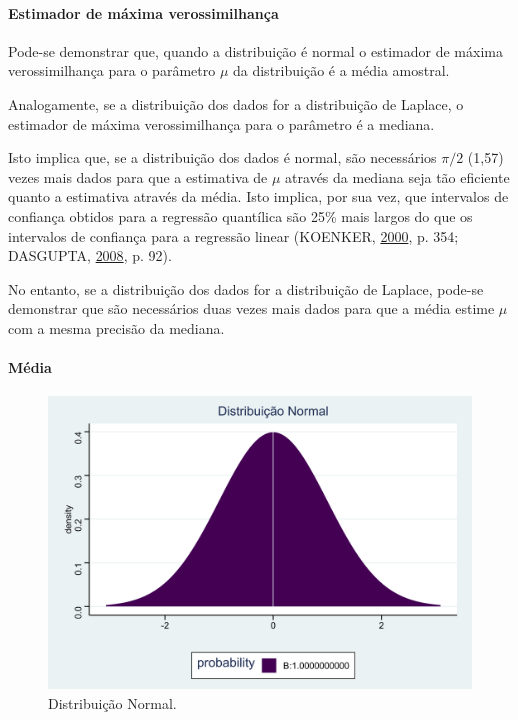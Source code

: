 \documentclass[a4paper, 12pt]{article}
\let\oldparagraph\paragraph
\renewcommand{\paragraph}[1]{\oldparagraph{#1}\mbox{}}
\begin{document}
\hypertarget{estimador-de-maxima-verossimilhanca}{%
\paragraph{Estimador de máxima
verossimilhança}\label{estimador-de-maxima-verossimilhanca}}

Pode-se demonstrar que, quando a distribuição é normal o estimador de
máxima verossimilhança para o parâmetro \(\mu\) da distribuição é a
média amostral.

Analogamente, se a distribuição dos dados for a distribuição de Laplace,
o estimador de máxima verossimilhança para o parâmetro é a mediana.

Isto implica que, se a distribuição dos dados é normal, são necessários
\(\pi/2\) (1,57) vezes mais dados para que a estimativa de \(\mu\)
através da mediana seja tão eficiente quanto a estimativa através da
média. Isto implica, por sua vez, que intervalos de confiança obtidos
para a regressão quantílica são 25\% mais largos do que os intervalos de
confiança para a regressão linear (KOENKER,
\protect\hyperlink{ref-koenker2000}{2000}, p. 354; DASGUPTA,
\protect\hyperlink{ref-dasGupta}{2008}, p. 92).

No entanto, se a distribuição dos dados for a distribuição de Laplace,
pode-se demonstrar que são necessários duas vezes mais dados para que a
média estime \(\mu\) com a mesma precisão da mediana.

\hypertarget{media}{%
\paragraph{Média}\label{media}}

\begin{figure}[H]

{\centering \includegraphics[width=0.7\linewidth]{images/dist_normal-1} 

}

\caption{Distribuição Normal.}\label{fig:dist_normal}
\end{figure}
\end{document}
